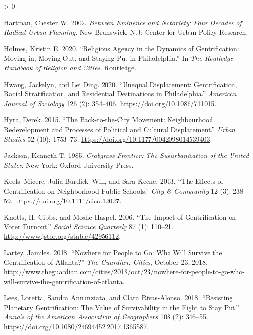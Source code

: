 \documentclass[
  12pt,
]{article}
\newlength{\cslhangindent}
\newenvironment{CSLReferences}[2] %
 {%
  \setlength{\parindent}{0pt}
  \ifodd #1 \everypar{\setlength{\hangindent}{\cslhangindent}}\ignorespaces\fi
  \ifnum #2 > 0
  \setlength{\parskip}{#2\baselineskip}
  \fi
 }%
 {}
\begin{document}
\begin{CSLReferences}{1}{0}
\leavevmode\hypertarget{ref-Hartman2002}{}%
Hartman, Chester W. 2002. \emph{Between Eminence and Notoriety: Four Decades of Radical Urban Planning}. {New Brunswick, N.J}: {Center for Urban Policy Research}.

\leavevmode\hypertarget{ref-Holmes2020}{}%
Holmes, Kristin E. 2020. {``Religious Agency in the Dynamics of Gentrification: {Moving} in, Moving Out, and Staying Put in {Philadelphia}.''} In \emph{The {Routledge Handbook} of {Religion} and {Cities}}. {Routledge}.

\leavevmode\hypertarget{ref-Hwang2020}{}%
Hwang, Jackelyn, and Lei Ding. 2020. {``Unequal {Displacement}: {Gentrification}, {Racial Stratification}, and {Residential Destinations} in {Philadelphia}.''} \emph{American Journal of Sociology} 126 (2): 354--406. \url{https://doi.org/10.1086/711015}.

\leavevmode\hypertarget{ref-Hyra2015}{}%
Hyra, Derek. 2015. {``The Back-to-the-City Movement: {Neighbourhood} Redevelopment and Processes of Political and Cultural Displacement.''} \emph{Urban Studies} 52 (10): 1753--73. \url{https://doi.org/10.1177/0042098014539403}.

\leavevmode\hypertarget{ref-Jackson1985}{}%
Jackson, Kenneth T. 1985. \emph{Crabgrass Frontier: The Suburbanization of the {United States}}. {New York}: {Oxford University Press}.

\leavevmode\hypertarget{ref-Keels2013}{}%
Keels, Micere, Julia Burdick--Will, and Sara Keene. 2013. {``The {Effects} of {Gentrification} on {Neighborhood Public Schools}.''} \emph{City \& Community} 12 (3): 238--59. \url{https://doi.org/10.1111/cico.12027}.

\leavevmode\hypertarget{ref-Knotts2006}{}%
Knotts, H. Gibbs, and Moshe Haspel. 2006. {``The {Impact} of {Gentrification} on {Voter Turnout}.''} \emph{Social Science Quarterly} 87 (1): 110--21. \url{http://www.jstor.org/stable/42956112}.

\leavevmode\hypertarget{ref-Lartey2018}{}%
Lartey, Jamiles. 2018. {``Nowhere for People to Go: Who Will Survive the Gentrification of {Atlanta}?''} \emph{The Guardian: Cities}, October 23, 2018. \url{http://www.theguardian.com/cities/2018/oct/23/nowhere-for-people-to-go-who-will-survive-the-gentrification-of-atlanta}.

\leavevmode\hypertarget{ref-Lees2018}{}%
Lees, Loretta, Sandra Annunziata, and Clara Rivas-Alonso. 2018. {``Resisting {Planetary Gentrification}: {The Value} of {Survivability} in the {Fight} to {Stay Put}.''} \emph{Annals of the American Association of Geographers} 108 (2): 346--55. \url{https://doi.org/10.1080/24694452.2017.1365587}.


\end{CSLReferences}
\end{document}
